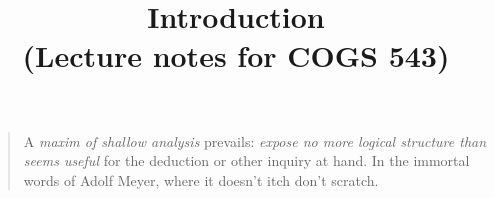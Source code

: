 \documentclass[11pt,a4paper,draft]{article}
\title{Introduction \\ \small (Lecture notes for COGS 543)}
\begin{document}
\maketitle


\begin{quote}

A \emph{maxim of shallow analysis} prevails: \emph{expose no more logical structure than seems useful} for the deduction or other inquiry at hand. In the immortal words of Adolf Meyer, where it doesn't itch don't scratch. 
\end{quote}





\end{document}
